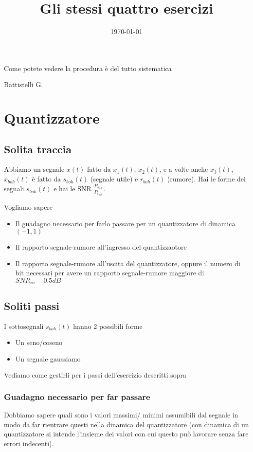 \documentclass[11pt]{article}
\date{\today}
\title{Gli stessi quattro esercizi}
\begin{document}
\maketitle
\tableofcontents

\epigraph{Come potete vedere la procedura è del tutto sistematica}{Battistelli G.}

\section{Quantizzatore}
\label{sec:orgbab6409}
\subsection{Solita traccia}
\label{sec:org6abe209}
Abbiamo un segnale \(x(t)\) fatto da \(x_1 (t)\), \(x_2 (t)\), e a volte
anche \(x_3 (t)\), \(x_{boh} (t)\) è fatto da \(s_{boh} (t)\) (segnale
utile) e \(r_{boh} (t)\) (rumore). Hai le forme dei segnali \(s_{boh}
(t)\) e hai le SNR \(\frac{P_{s_{boh}}}{P_{r_{boh}}}\).\par

Vogliamo sapere
\begin{itemize}
\item Il guadagno necessario per farlo passare per un
quantizzatore di dinamica \((-1, 1)\)
\item Il rapporto segnale-rumore all'ingresso del quantizzaotore
\item Il rapporto segnale-rumore all'uscita del quantizzatore,
oppure il numero di bit necessari per avere un rapporto
segnale-rumore maggiore di \(SNR_{in} - 0.5dB\)
\end{itemize}

\subsection{Soliti passi}
\label{sec:org32da708}
I sottosegnali \(s_{boh} (t)\) hanno 2 possibili forme
\begin{itemize}
\item Un seno/coseno
\item Un segnale gaussiamo
\end{itemize}
Vediamo come gestirli per i passi dell'esercizio descritti sopra

\subsubsection{Guadagno necessario per far passare}
\label{sec:org921a614}
Dobbiamo sapere quali sono i valori massimi/ minimi assumibili dal
segnale in modo da far rientrare questi nella dinamica del
quantizzatore (con dinamica di un quantizzatore si intende l'insieme
dei valori con cui questo può lavorare senza fare errori indecenti).
\end{document}
